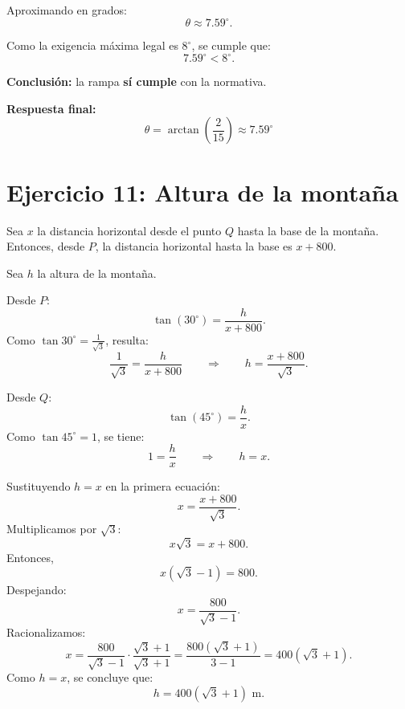 \documentclass[12pt]{article}
\begin{document}
	Aproximando en grados:
	\[
	\theta\approx 7.59^\circ.
	\]
	
	Como la exigencia máxima legal es \(8^\circ\), se cumple que:
	\[
	7.59^\circ<8^\circ.
	\]
	
	\textbf{Conclusión:} la rampa \textbf{sí cumple} con la normativa.
	
	\textbf{Respuesta final:}
	\[
	\boxed{\theta=\arctan\left(\frac{2}{15}\right)\approx 7.59^\circ}
	\]
	
	\section*{Ejercicio 11: Altura de la montaña}
	Sea \(x\) la distancia horizontal desde el punto \(Q\) hasta la base de la montaña. Entonces, desde \(P\), la distancia horizontal hasta la base es \(x+800\).
	
	Sea \(h\) la altura de la montaña.
	
	Desde \(P\):
	\[
	\tan(30^\circ)=\frac{h}{x+800}.
	\]
	Como \(\tan 30^\circ=\frac{1}{\sqrt3}\), resulta:
	\[
	\frac{1}{\sqrt3}=\frac{h}{x+800}
	\qquad\Rightarrow\qquad
	h=\frac{x+800}{\sqrt3}.
	\]
	
	Desde \(Q\):
	\[
	\tan(45^\circ)=\frac{h}{x}.
	\]
	Como \(\tan45^\circ=1\), se tiene:
	\[
	1=\frac{h}{x}
	\qquad\Rightarrow\qquad
	h=x.
	\]
	
	Sustituyendo \(h=x\) en la primera ecuación:
	\[
	x=\frac{x+800}{\sqrt3}.
	\]
	Multiplicamos por \(\sqrt3\):
	\[
	x\sqrt3=x+800.
	\]
	Entonces,
	\[
	x(\sqrt3-1)=800.
	\]
	Despejando:
	\[
	x=\frac{800}{\sqrt3-1}.
	\]
	Racionalizamos:
	\[
	x=\frac{800}{\sqrt3-1}\cdot\frac{\sqrt3+1}{\sqrt3+1}
	=\frac{800(\sqrt3+1)}{3-1}
	=400(\sqrt3+1).
	\]
	Como \(h=x\), se concluye que:
	\[
	\boxed{h=400(\sqrt3+1)\text{ m}}.
	\]
	
\end{document}
